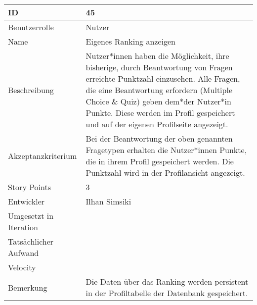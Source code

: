 \begin{tabularx}{\textwidth}{|p{}|X|}
	\hline
	ID & 45\\
	\hline
	Benutzerrolle & Nutzer\\
	\hline
	Name & Eigenes Ranking anzeigen\\
	\hline
	Beschreibung & Nutzer*innen haben die Möglichkeit, ihre bisherige, durch Beantwortung von Fragen erreichte Punktzahl einzusehen. Alle Fragen, die eine Beantwortung erfordern (Multiple Choice \& Quiz) geben dem*der Nutzer*in Punkte. Diese werden im Profil gespeichert und auf der eigenen Profilseite angezeigt.\\
	\hline
	Akzeptanzkriterium & Bei der Beantwortung der oben genannten Fragetypen erhalten die Nutzer*innen Punkte, die in ihrem Profil gespeichert werden. Die Punktzahl wird in der Profilansicht angezeigt.\\
	\hline
	Story Points & 3\\
	\hline
	Entwickler & Ilhan Simsiki\\
	\hline
	Umgesetzt in Iteration & \\
	\hline
	Tatsächlicher Aufwand & \\
	\hline
	Velocity & \\
	\hline
	Bemerkung & Die Daten über das Ranking werden persistent in der Profiltabelle der Datenbank gespeichert.\\
	\hline
\end{tabularx}
\vspace{20pt}
